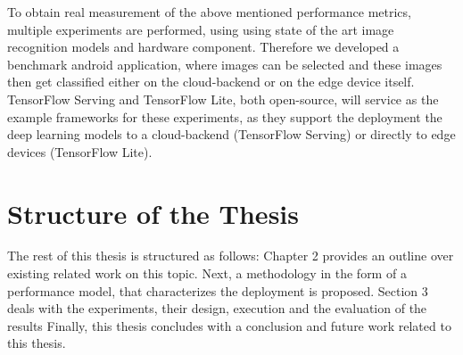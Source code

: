 To obtain real measurement of the above mentioned performance metrics, multiple experiments are performed, using  using state of the art image recognition models and hardware component. Therefore we developed a benchmark android application, where images can be selected and these images then get classified either on the cloud-backend or on the edge device itself.
TensorFlow Serving and TensorFlow Lite, both open-source, will service as the example frameworks for these experiments, as they support the deployment the deep learning models to a cloud-backend (TensorFlow Serving) or directly to edge devices (TensorFlow Lite).


\section{Structure of the Thesis}
The rest of this thesis is structured as follows: Chapter 2 provides an outline over existing related work on this topic. Next, a methodology in the form of a performance model, that characterizes the deployment is proposed.
Section 3 deals with the experiments, their design, execution and the evaluation of the results
Finally, this thesis concludes with a conclusion and future work related to this thesis.
\endinput 

